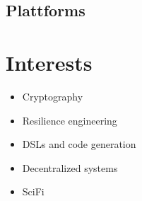 \documentclass{gnet_cv}
\begin{document}
\subsection{Plattforms}

\section{Interests}
\begin{minipage}[t]{0.45\textwidth}
\begin{itemize}
    \setlength\itemsep{0pt}
    \item Cryptography
    \item Resilience engineering
    \item DSLs and code generation
\end{itemize}
\end{minipage}
\begin{minipage}[t]{0.45\textwidth}
\begin{itemize}
    \setlength\itemsep{0pt}
    \item Decentralized systems
    \item SciFi
\end{itemize}
\end{minipage}
\end{document}
